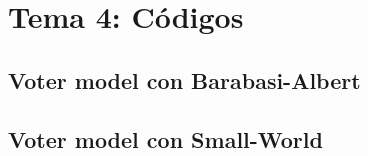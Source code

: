 \chapter{Tema 4: Códigos}

\section{Voter model con Barabasi-Albert}


\section{Voter model con Small-World}

